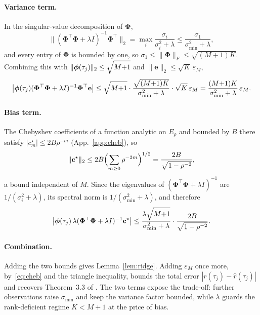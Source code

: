 \paragraph{Variance term.} In the singular-value decomposition of
$\mathbf{\Phi}$,
\begin{equation}
  \|(\mathbf{\Phi}^\top\mathbf{\Phi} + \lambda I)^{-1}\mathbf{\Phi}^\top\|_2
  = \max_i \frac{\sigma_i}{\sigma_i^2 + \lambda}
  \le \frac{\sigma_1}{\sigma_{\min}^2 + \lambda},
\end{equation}
and every entry of $\mathbf{\Phi}$ is bounded by one, so
$\sigma_1 \le \|\mathbf{\Phi}\|_F \le \sqrt{(M{+}1)K}$. Combining this
with $\|\boldsymbol{\phi}(\tau_j)\|_2 \le \sqrt{M{+}1\strut}$ and
$\|\mathbf{e}\|_2 \le \sqrt{K}\,\varepsilon_M$,
\begin{equation}
  \bigl|\boldsymbol{\phi}(\tau_j)
  (\mathbf{\Phi}^\top\mathbf{\Phi} + \lambda I)^{-1}\mathbf{\Phi}^\top \mathbf{e}\bigr|
  \le \sqrt{M{+}1\strut}\cdot\frac{\sqrt{(M{+}1)K}}{\sigma_{\min}^2 + \lambda}
      \cdot\sqrt{K}\,\varepsilon_M
  = \frac{(M{+}1)K}{\sigma_{\min}^2 + \lambda}\,\varepsilon_M.
\end{equation}

\paragraph{Bias term.} The Chebyshev coefficients of a function
analytic on $E_\rho$ and bounded by $B$ there satisfy
$|c^\star_m| \le 2B\rho^{-m}$ (App.~\ref{app:cheb}), so
\begin{equation}
  \|\mathbf{c}^\star\|_2
  \le 2B\Bigl(\sum_{m \ge 0}\rho^{-2m}\Bigr)^{1/2}
  = \frac{2B}{\sqrt{1-\rho^{-2}}},
\end{equation}
a bound independent of $M$. Since the eigenvalues of
$(\mathbf{\Phi}^\top\mathbf{\Phi} + \lambda I)^{-1}$ are
$1/(\sigma_i^2 + \lambda)$, its spectral norm is
$1/(\sigma_{\min}^2 + \lambda)$, and therefore
\begin{equation}
  \bigl|\boldsymbol{\phi}(\tau_j)\,
  \lambda(\mathbf{\Phi}^\top\mathbf{\Phi} + \lambda I)^{-1}\mathbf{c}^\star\bigr|
  \le \frac{\lambda\sqrt{M{+}1\strut}}{\sigma_{\min}^2 + \lambda}
      \cdot\frac{2B}{\sqrt{1-\rho^{-2}}}.
\end{equation}

\paragraph{Combination.} Adding the two bounds gives
Lemma~\ref{lem:ridge}. Adding $\varepsilon_M$ once more,
by~\eqref{eq:cheb} and the triangle inequality, bounds the total error
$|r(\tau_j) - \hat{r}(\tau_j)|$ and recovers Theorem~3.3
of \citet{spectrum}. The two terms expose the trade-off: further
observations raise $\sigma_{\min}$ and keep the variance factor
bounded, while $\lambda$ guards the rank-deficient regime $K < M{+}1$
at the price of bias.

